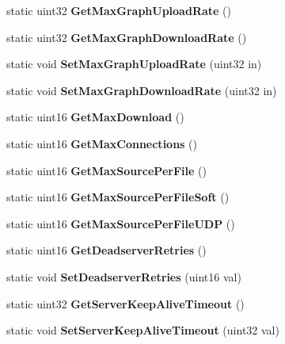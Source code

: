 \begin{DoxyCompactItemize}
\item 
static uint32 {\bfseries GetMaxGraphUploadRate} ()\label{classCPreferences_abefc060076c840f9362110ebd9bbb9b1}

\item 
static uint32 {\bfseries GetMaxGraphDownloadRate} ()\label{classCPreferences_a78d039c658d77c2bd65c1c3148ddfe7b}

\item 
static void {\bfseries SetMaxGraphUploadRate} (uint32 in)\label{classCPreferences_a2deaab5bcd5b500e7542ab7317ae18a4}

\item 
static void {\bfseries SetMaxGraphDownloadRate} (uint32 in)\label{classCPreferences_a8110837e8b6d6333f85f5485c3877bdc}

\item 
static uint16 {\bfseries GetMaxDownload} ()\label{classCPreferences_aa1ef1fdb6e20fed05b02c173caa7f9db}

\item 
static uint16 {\bfseries GetMaxConnections} ()\label{classCPreferences_a76f44c45b1940c17d6e2bd42853badd7}

\item 
static uint16 {\bfseries GetMaxSourcePerFile} ()\label{classCPreferences_a02815a8120f66bef437393314cc779fd}

\item 
static uint16 {\bfseries GetMaxSourcePerFileSoft} ()\label{classCPreferences_afff84a1bc20afc812e785a0b2bbcae00}

\item 
static uint16 {\bfseries GetMaxSourcePerFileUDP} ()\label{classCPreferences_a7ad6be07598acf0c57943c30f1869b9d}

\item 
static uint16 {\bfseries GetDeadserverRetries} ()\label{classCPreferences_a01a6e2f41fa0145ec70ec7316c4b94e7}

\item 
static void {\bfseries SetDeadserverRetries} (uint16 val)\label{classCPreferences_ada9a6e99867b1898f35a0f8381843a5c}

\item 
static uint32 {\bfseries GetServerKeepAliveTimeout} ()\label{classCPreferences_a52a13ef8af11a84798652c8a52f138c6}

\item 
static void {\bfseries SetServerKeepAliveTimeout} (uint32 val)\label{classCPreferences_ac3fb28704679ec423b90a307212ef147}


\end{DoxyCompactItemize}
